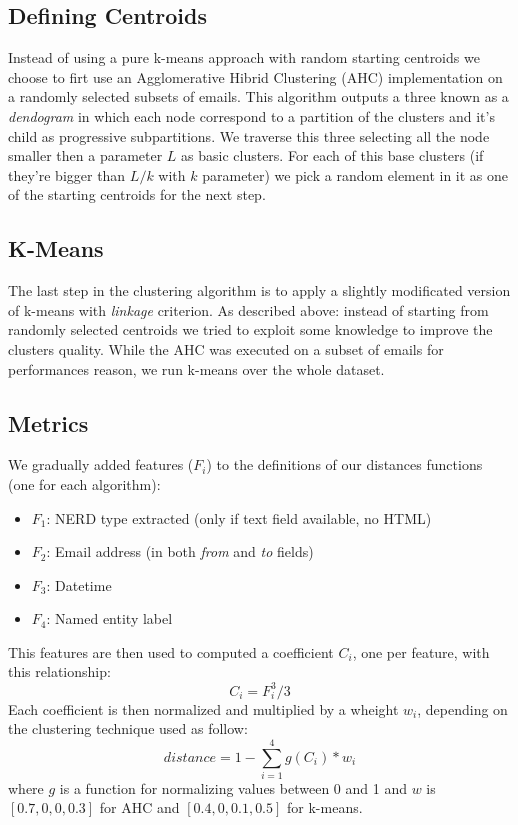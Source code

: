 \documentclass[a4paper,12pt]{report}
\begin{document}
\subsection{Defining Centroids}
Instead of using a pure k-means approach with random starting centroids we choose to firt use an Agglomerative Hibrid Clustering (AHC) implementation on a randomly selected subsets of emails. This algorithm outputs a three known as a \emph{dendogram} in which each node correspond to a partition of the clusters and it's child as progressive subpartitions. We traverse this three selecting all the node smaller then a parameter $L$ as basic clusters.
For each of this base clusters (if they're bigger than $L/k$ with $k$ parameter) we pick a random element in it as one of the starting centroids for the next step.

\subsection{K-Means}
The last step in the clustering algorithm is to apply a slightly modificated version of k-means with \emph{linkage} criterion. As described above: instead of starting from randomly selected centroids we tried to exploit some knowledge to improve the clusters quality. While the AHC was executed on a subset of emails for performances reason, we run k-means over the whole dataset.

\subsection{Metrics}
We gradually added features ($F_{i}$) to the definitions of our distances functions (one for each algorithm):
\begin{itemize}
\item $F_{1}$: NERD type extracted (only if text field available, no HTML)
\item $F_{2}$: Email address (in both \emph{from} and \emph{to} fields)
\item $F_{3}$: Datetime 
\item $F_{4}$: Named entity label
\end{itemize}

This features are then used to computed a coefficient $C_{i}$, one per feature, with this relationship:
\[C_{i} = F_{i}^3 / 3 \]
Each coefficient is then normalized and multiplied by a wheight $w_{i}$, depending on the clustering technique used as follow:
\[distance = 1 - \sum_{i=1}^{4} g(C_i)*w_i \]
where $g$ is a function for normalizing values between 0 and 1 and $w$ is $[0.7, 0, 0, 0.3]$ for AHC and $[0.4, 0, 0.1, 0.5]$ for k-means.
\end{document}
